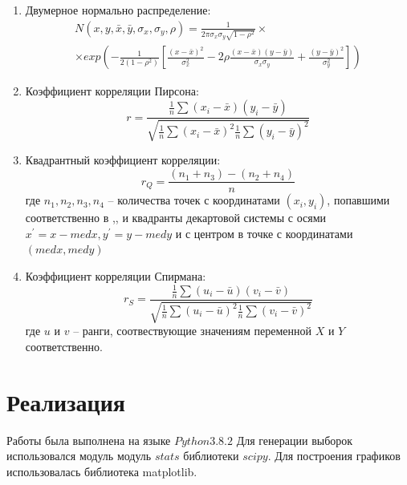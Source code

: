 \documentclass[a4]{article}
\newcommand{\RomanNumeralCaps}[1]
    {\MakeUppercase{\romannumeral #1}}
\begin{document}
\begin{enumerate}
    \item Двумерное нормально распределение:
        \begin{multline}
        N(x,y,\bar{x},\bar{y},\sigma_{x},\sigma_{y},\rho)=\frac{1}{2\pi\sigma_{x}\sigma_{y}\sqrt{1-\rho^{2}}}\times\\
        \times exp(-\frac{1}{2(1-\rho^{2})}[\frac{(x-\bar{x})^{2}}{\sigma_{x}^{2}}-2\rho\frac{(x-\bar{x})(y-\bar{y})}{\sigma_{x}\sigma_{y}}+\frac{(y-\bar{y})^{2}}{\sigma_{y}^{2}}])
        \end{multline}
    
    \item Коэффициент корреляции Пирсона:
        \begin{equation}
        r=\frac{\frac{1}{n}\sum(x_{i}-\bar{x})(y_{i}-\bar{y})}{\sqrt{\frac{1}{n}\sum(x_{i}-\bar{x})^{2}\frac{1}{n}\sum(y_{i}-\bar{y})^{2}}}
        \end{equation}
        
        \item Квадрантный коэффициент корреляции:
        \begin{equation}
        r_{Q} = \frac{(n_{1} + n_{3}) - (n_{2} + n_{4})}{n}
        \end{equation}
        где $ n_{1},n_{2},n_{3},n_{4} $ -- количества точек с координатами $ (x_{i},y_{i}) $, попавшими соответственно в \RomanNumeralCaps{1},\RomanNumeralCaps{2},\RomanNumeralCaps{3} и \RomanNumeralCaps{4} квадранты декартовой системы с осями $x^{'}=x-med x, y^{'}=y-med y  $ и с центром в точке с координатами$ (med x, med y) $
    \item Коэффициент корреляции Спирмана:
        \begin{equation}
        r_{S}=\frac{\frac{1}{n}\sum(u_{i}-\bar{u})(v_{i}-\bar{v})}{\sqrt{\frac{1}{n}\sum(u_{i}-\bar{u})^{2}\frac{1}{n}\sum(v_{i}-\bar{v})^{2}}}
        \end{equation}
        где $ u $ и $ v $ -- ранги, соотвествующие значениям переменной $X$ и $ Y $ соответственно.
        
\end{enumerate}

\section{Реализация}
Работы была выполнена на языке $Python 3.8.2$
Для генерации выборок использовался модуль модуль $stats$ библиотеки $scipy$.
Для построения графиков использовалась библиотека matplotlib.
\end{document}
